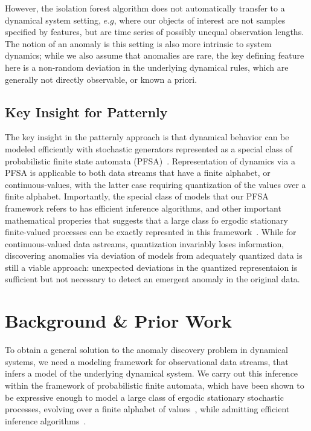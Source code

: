 \documentclass[9pt,journal]{IEEEtran}
\begin{document}
{However,   the isolation forest algorithm does not automatically transfer to a dynamical system setting, $e.g$, where our objects of interest are not samples specified by features, but are time series of possibly unequal observation lengths. The notion of an anomaly is this setting is also more intrinsic to system dynamics; while we also assume that anomalies are rare, the key defining feature here  is a non-random deviation in the underlying dynamical rules, which are generally not directly observable, or known a priori. 

\subsection{Key Insight for Patternly}
The key insight in the patternly approach is that dynamical behavior can be modeled efficiently with stochastic generators represented as a special class of probabilistic finite state automata (PFSA)~\cite{chattopadhyay2008structural,chattopadhyay2013abductive}. Representation of dynamics via a PFSA is applicable to both data streams that have a finite alphabet, or continuous-values, with the latter case requiring quantization of the values over a finite alphabet. Importantly, the special class of models that our PFSA framework refers to has efficient inference algorithms, and other important mathematical properies that suggests that a large class fo ergodic stationary finite-valued processes can be exactly represnted in this framework~\cite{chattopadhyay2020deep}. While for continuous-valued data astreams, quantization invariably loses information, discovering anomalies via deviation of  models from adequately quantized data is still a viable approach: unexpected deviations in the quantized representaion is sufficient but not necessary to detect an emergent anomaly in the original data.

  \section{Background \& Prior Work}
  \label{sec:Background}

To obtain a general solution to the anomaly discovery problem in dynamical systems, we need a modeling framework for observational data streams, that infers a model of the underlying dynamical system. We carry out this inference within the framework of probabilistic finite automata, which have been shown to be expressive enough to model a large class of ergodic stationary stochastic processes, evolving over a finite alphabet of values~\cite{chattopadhyay2020deep,chattopadhyay2014data,crutchfield1994calculi,chattopadhyay2008structural}, while admitting efficient inference algorithms~\cite{chattopadhyay2013abductive}.
  
}
\end{document}
